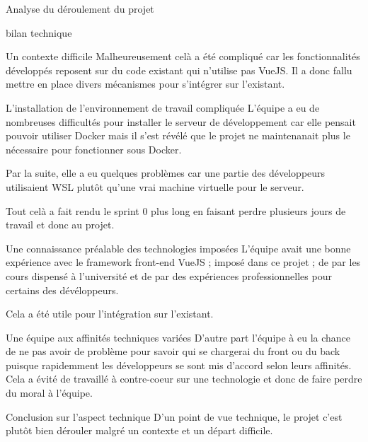 \documentclass[]{article}
\begin{document}
{\begin{section}{Analyse du déroulement du projet}
\begin{subsection}{bilan technique}
\begin{subsubsection}{Un contexte difficile}
         Malheureusement celà a été compliqué car les fonctionnalités développés reposent sur du code existant qui n'utilise pas VueJS. Il a donc fallu mettre en place divers mécanismes pour s'intégrer sur l'existant.
     \end{subsubsection}

     \begin{subsubsection}{L'installation de l'environnement de travail compliquée}
         L'équipe a eu de nombreuses difficultés pour installer le serveur de développement car elle pensait pouvoir utiliser Docker mais il s'est révélé que le projet ne maintenanait plus le nécessaire pour fonctionner sous Docker.

         Par la suite, elle a eu quelques problèmes car une partie des développeurs utilisaient WSL plutôt qu'une vrai machine virtuelle pour le serveur.

         Tout celà a fait rendu le sprint 0 plus long en faisant perdre plusieurs jours de travail et donc au projet.
     \end{subsubsection}

     \begin{subsubsection}{Une connaissance préalable des technologies imposées }
         L'équipe avait une bonne expérience avec le framework front-end VueJS ; imposé dans ce projet ; de par les cours dispensé à l'université et de par des expériences professionnelles pour certains des dévéloppeurs.

         Cela a été utile pour l'intégration sur l'existant.
     \end{subsubsection}

     \begin{subsubsection}{Une équipe aux affinités techniques variées }
         D'autre part l'équipe à eu la chance de ne pas avoir de problème pour savoir qui se chargerai du front ou du back puisque rapidemment les développeurs se sont mis d'accord selon leurs affinités. Cela a évité de travaillé à contre-coeur sur une technologie et donc de faire perdre du moral à l'équipe.
     \end{subsubsection}

     \begin{subsubsection}{Conclusion sur l'aspect technique}
        D'un point de vue technique, le projet c'est plutôt bien dérouler malgré un contexte et un départ difficile.
     \end{subsubsection}
 \end{subsection}


\end{section}}
\end{document}
